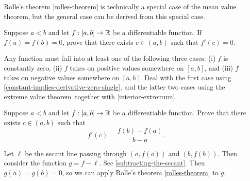 Rolle's theorem \ref{rolles-theorem} is technically a special case of the mean value theorem, but the general case can be derived from this special case. 

\begin{exercise} \label{rolles-theorem}  
	Suppose $a < b$ and let $f : [a, b] \to \mathbb{R}$ be a differentiable function. If $f(a) = f(b) = 0$, prove that there exists $c \in (a, b)$ such that $f'(c) = 0$. \begin{hint} Any function must fall into at least one of the following three cases: (i) $f$ is constantly zero, (ii) $f$ takes on positive values somewhere on $[a, b]$, and (iii) $f$ takes on negative values somewhere on $[a, b]$. Deal with the first case using \cref{constant-implies-derivative-zero-single}, and the latter two cases using the extreme value theorem\footnotemark\ together with \cref{interior-extremum}. 
	\end{hint}
\end{exercise}


\begin{exercise} \label{mean-value-theorem} 
	Suppose $a < b$ and let $f : [a, b] \to \mathbb{R}$ be a differentiable function. Prove that there exists $c \in (a, b)$ such that
	\[ f'(c) = \frac{f(b) - f(a)}{b-a}. \]
	\begin{hint} Let $\ell$ be the secant line passing through $(a, f(a))$ and $(b, f(b))$. Then consider the function $g = f - \ell$. See \cref{subtracting-the-secant}. 
	Then $g(a) = g(b) = 0$, so we can apply Rolle's theorem \ref{rolles-theorem} to $g$.
	\end{hint} 
\end{exercise}

